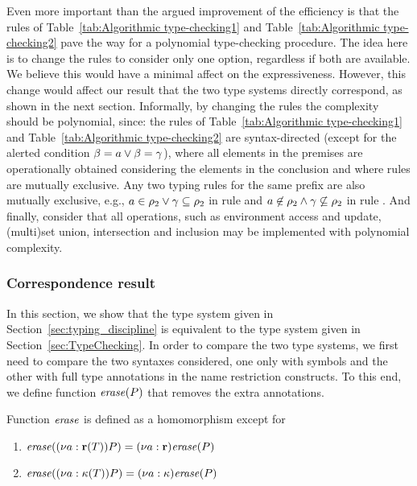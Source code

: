 Even more important than the argued improvement of the efficiency is that the rules of Table~\ref{tab:Algorithmic type-checking1} and Table~\ref{tab:Algorithmic type-checking2} pave the way for a polynomial type-checking procedure. 
The idea here is to change the rules to consider only one option, regardless if both are available. We believe this would have a minimal affect on the expressiveness. However, this change would affect our result that the two type systems directly correspond, as shown in the next section. %
Informally, by changing the rules the complexity should be polynomial, since: the rules of Table~\ref{tab:Algorithmic type-checking1} and Table~\ref{tab:Algorithmic type-checking2} are syntax-directed (except for the alerted condition $\beta=a \vee \beta=\gamma$), where all elements in the premises are operationally obtained considering the elements in the conclusion and where rules are mutually exclusive. 
Any two typing rules for the same prefix are also mutually exclusive, e.g.,  $a\in\rho_2  \vee  \gamma\subseteq\rho_2$ in rule  and $ a\not\in\rho_2  \wedge  \gamma\not\subseteq\rho_2$ in rule . And finally, consider that all operations, such as environment access and update, (multi)set union, intersection and inclusion may be implemented with polynomial complexity. 


\subsubsection{Correspondence result}\label{sec:correspondence_result}

In this section, we show that the type system given in Section~\ref{sec:typing_discipline} is equivalent to the type system given in Section~\ref{sec:TypeChecking}. %
In order to compare the two type systems, we first need to compare the two syntaxes considered, one only with symbols and the other with full type annotations in the name restriction constructs. To this end, we define
 function $\mathit{erase}(P)$ that removes the extra annotations.

\begin{definition}
Function $\mathit{erase}$ is defined as a homomorphism except for 
\begin{enumerate}
\item $\mathit{erase}((\nu a :{\mathbf{r}}(T))P)=(\nu a :{\mathbf{r}})\mathit{erase}(P)$
\item $\mathit{erase}((\nu a : {\mathbf{\kappa}}(T))P)= (\nu a : {\mathbf{\kappa}})\mathit{erase}(P)$
\end{enumerate}
\end{definition}

